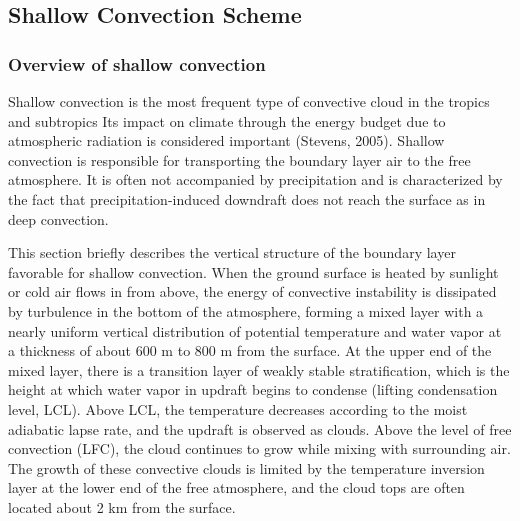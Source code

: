 

\subsection{Shallow Convection Scheme}\label{shallow-convection-scheme}

\subsubsection{Overview of shallow convection}\label{overview-of-shallow-convection}
Shallow convection is the most frequent type of convective cloud in the tropics and subtropics Its impact on climate through the energy budget due to atmospheric radiation is considered important (Stevens, 2005).
Shallow convection is responsible for transporting the boundary layer air to the free atmosphere. It is often not accompanied by precipitation and is characterized by the fact that precipitation-induced downdraft does not reach the surface as in deep convection.

This section briefly describes the vertical structure of the boundary layer favorable for shallow convection.
When the ground surface is heated by sunlight or cold air flows in from above, the energy of convective instability is dissipated by turbulence in the bottom of the atmosphere, forming a mixed layer with a nearly uniform vertical distribution of 
potential temperature and water vapor at a thickness of about 600 m to 800 m from the surface.
At the upper end of the mixed layer, there is a transition layer of weakly stable stratification, which is the height at which water vapor in updraft begins to condense (lifting condensation level, LCL).
Above LCL, the temperature decreases according to the moist adiabatic lapse rate, and the updraft is observed as clouds. Above the level of free convection (LFC), the cloud continues to grow while mixing with surrounding air. 
The growth of these convective clouds is limited by the temperature inversion layer at the lower end of the free atmosphere, and the cloud tops are often located about 2 km from the surface.

